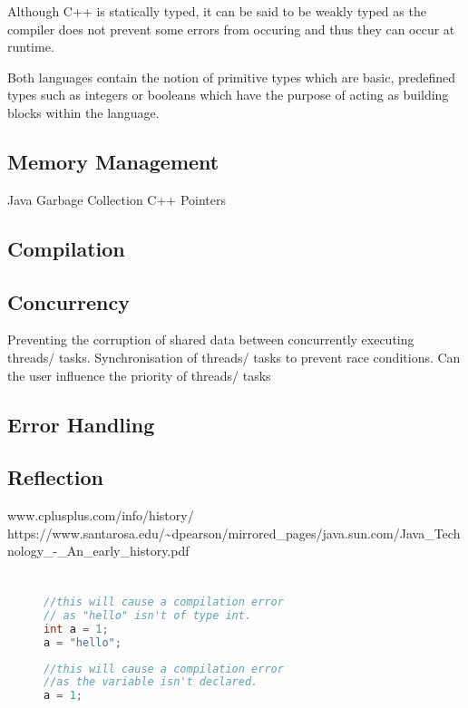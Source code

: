 \documentclass[]{report}
\begin{document}
Although C++ is statically typed, it can be said to be weakly typed as the compiler does not prevent some errors from occuring and thus they can occur at runtime.

Both languages contain the notion of primitive types which are basic, predefined types such as integers or booleans which have the purpose of acting as building blocks within the language.

\section{Memory Management}
Java Garbage Collection
C++ Pointers

\section{Compilation}

\section{Concurrency}
Preventing the corruption of shared data between
concurrently executing threads/ tasks.
Synchronisation of threads/ tasks to prevent race
conditions.
Can the user influence the priority of threads/ tasks

\section{Error Handling}

\section{Reflection}

\begin{thebibliography}{20}
	www.cplusplus.com/info/history/
	https://www.santarosa.edu/\textasciitilde{}dpearson/mirrored\_pages/java.sun.com/Java\_Technology\_-\_An\_early\_history.pdf
\end{thebibliography}

\appendix
\chapter{}
\begin{figure}[h!]
	\begin{lstlisting}[language=Java,frame=single]
//this will cause a compilation error
// as "hello" isn't of type int.
int a = 1;
a = "hello";
	\end{lstlisting}
		\begin{lstlisting}[language=Java,frame=single]
//this will cause a compilation error
//as the variable isn't declared.
a = 1;
		\end{lstlisting}
\end{figure}
\end{document}
